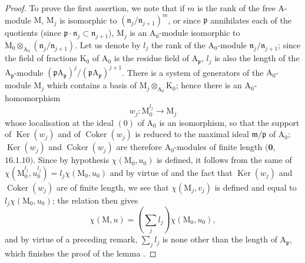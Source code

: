\begin{proof}
To prove the first assertion, we note that if $m$ is the rank of the free A-module $\mathrm{M}$, $\mathrm{M}_j$ is isomorphic to $(\mathfrak{n}_j/\mathfrak{n}_{j+1})^m$, or since $\mathfrak{p}$ annihilates each of the quotients (since $\mathfrak{p}\cdot\mathfrak{n}_j\subset\mathfrak{n}_{j+1}$), $\mathrm{M}_j$ is an $\mathrm{A}_0$-module isomorphic to $\mathrm{M}_0\otimes_{\mathrm{A}_0}(\mathfrak{n}_j/\mathfrak{n}_{j+1})$.
Let us denote by $l_j$ the rank of the $\mathrm{A}_0$-module $\mathfrak{n}_j/\mathfrak{n}_{j+1}$; since the field of fractions $\mathrm{K}_0$ of $\mathrm{A}_0$ is the residue field of $\mathrm{A}_{\mathfrak{p}}$, $l_j$ is also the length of the $\mathrm{A}_{\mathfrak{p}}$-module $(\mathfrak{p}\mathrm{A}_{\mathfrak{p}})^j/(\mathfrak{p}\mathrm{A}_{\mathfrak{p}})^{j+1}$.
There is a system of generators of the $\mathrm{A}_0$-module $\mathrm{M}_j$ which contains a basis of $\mathrm{M}_j\otimes_{\mathrm{A}_0}\mathrm{K}_0$; hence there is an $\mathrm{A}_0$-homomorphism
\[
  w_j:\mathrm{M}_0^{l_j}\to\mathrm{M}_j
\]
whose localisation at the ideal $(0)$ of $\mathrm{A}_0$ is an isomorphism, so that the support of $\operatorname{Ker}(w_j)$ and of $\operatorname{Coker}(w_j)$ is reduced to the maximal ideal $\mathfrak{m}/\mathfrak{p}$ of $\mathrm{A}_0$; $\operatorname{Ker}(w_j)$ and $\operatorname{Coker}(w_j)$ are therefore $\mathrm{A}_0$-modules of finite length $(\mathbf{0}$, $16.1.10)$.
Since by hypothesis $\chi(\mathrm{M}_0,u_0)$ is defined, it follows from the same of $\chi(\mathrm{M}_0^{l_j},u_0^{l_j})=l_j\chi(\mathrm{M}_0,u_0)$ and by virtue of  and the fact that $\operatorname{Ker}(w_j)$ and $\operatorname{Coker}(w_j)$ are of finite length, we see that $\chi(\mathrm{M}_j,v_j)$ is defined and equal to $l_j\chi(\mathrm{M}_0,u_0)$; the relation  then gives
\[
  \chi(\mathrm{M},u)=(\sum_j l_j)\chi(\mathrm{M}_0,u_0),
\]
and by virtue of a preceding remark, $\sum_j l_j$ is none other than the length of $\mathrm{A}_{\mathfrak{p}}$, which finishes the proof of the lemma .
\end{proof}

